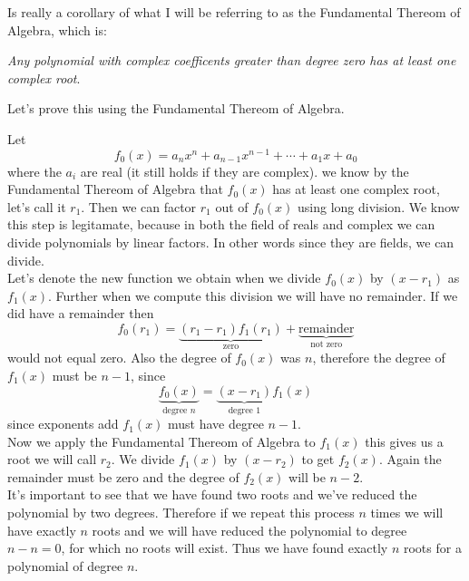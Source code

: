 \documentclass[12pt]{article}
\begin{document}
Is really a corollary of what I will be referring to as the Fundamental Thereom of Algebra, which is:

 \emph{Any polynomial with complex coefficents greater than degree zero has at least one complex root}.

Let's prove this using the Fundamental Thereom of Algebra.

Let 
$$f_0(x) = a_n x^n + a_{n-1} x^{n-1} + \cdots + a_1 x + a_0$$
where the $a_i$ are real (it still holds if they are complex).  we know by the Fundamental Thereom of Algebra that $f_0(x)$ has at least one complex root, let's call it $r_1$.  Then we can factor $r_1$ out of $f_0(x)$ using long division.  We know this step is legitamate, because in both the field of reals and complex we can divide polynomials by linear factors.  In other words since they are fields, we can divide.\\

Let's denote the new function we obtain when we divide $f_0(x)$ by $(x-r_1)$ as $f_1(x)$.  Further when we compute this division we will have no remainder.  If we did have a remainder then 
$$f_0(r_1)= \underbrace{(r_1-r_1) f_1(r_1)}_{\text{zero}} + \underbrace{\text{remainder}}_{\text{not zero}}$$
would not equal zero.  Also the degree of $f_0(x)$ was $n$, therefore the degree of  $f_1(x)$ must be $n-1$, since 
$$ \underbrace{f_0(x)}_{\text{degree } n}= \underbrace{(x-r_1)}_{\text{degree }1} f_1(x)$$
since exponents add $f_1(x)$ must have degree $n-1$.\\

Now we apply the Fundamental Thereom of Algebra to $f_1(x)$ this gives us a root we will call $r_2$.  We divide $f_1(x)$ by $(x-r_2)$ to get $f_2(x)$.  Again the remainder must be zero and the degree of $f_2(x)$ will be $n-2$.\\

It's important to see that we have found two roots and we've reduced the polynomial by two degrees.  Therefore if we repeat this process $n$ times we will have exactly $n$ roots and we will have reduced the polynomial to degree $n-n=0$, for which no roots will exist.  Thus we have found exactly $n$ roots for a polynomial of degree $n$.
\end{document}
